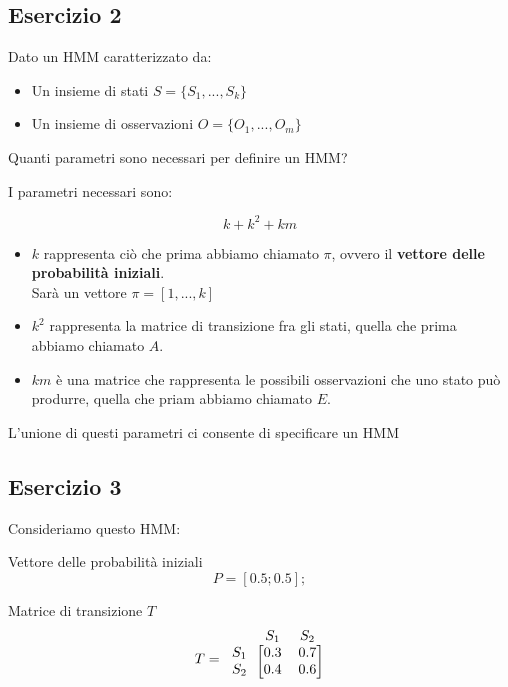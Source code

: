 \documentclass{article}
\begin{document}
\pagebreak
	\subsection{Esercizio 2}
	Dato un HMM caratterizzato da:
	\begin{itemize}
		\item Un insieme di stati $S = \{S_1, ..., S_k\}$
		\item Un insieme di osservazioni  $O = \{O_1, ..., O_m\}$
	\end{itemize}
	
	Quanti parametri sono necessari per definire un HMM?
	
	I parametri necessari sono:
	
	\[
		k + k^2 + km
	\]
	
\begin{itemize}
	\item $k$ rappresenta ciò che prima abbiamo chiamato $\pi$, ovvero il \textbf{vettore delle probabilità iniziali}. \\
	Sarà un vettore $\pi = [1, ..., k]$
	
	\item $k^2$ rappresenta la matrice di transizione fra gli stati, quella che prima abbiamo chiamato $A$.
	
	\item $km$ è una matrice che rappresenta le possibili osservazioni che uno stato può produrre, quella che priam abbiamo chiamato $E$.
\end{itemize}

L'unione di questi parametri ci consente di specificare un HMM

\pagebreak

\subsection{Esercizio 3}

Consideriamo questo HMM:

Vettore delle probabilità iniziali
\[P  = [0.5; 0.5];\]

Matrice di transizione $T$
\[
T = 
\begin{blockarray}{ccc}
	& S_1 & S_2 \\
	\begin{block}{c[cc]}
	S_1 &	0.3  &  0.7   \\
	S_2 &	0.4  &  0.6   \\
	\end{block}
\end{blockarray}
\]	
\end{document}
